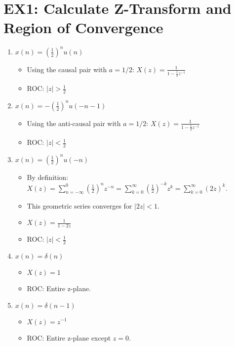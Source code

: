 \documentclass[a4paper,12pt]{article}
\begin{document}
\section*{EX1: Calculate Z-Transform and Region of Convergence}
\begin{enumerate}
    \item \textbf{$x(n) = (\frac{1}{2})^n u(n)$}
        \begin{itemize}
            \item Using the causal pair with $a=1/2$: $X(z) = \frac{1}{1-\frac{1}{2}z^{-1}}$
            \item ROC: $|z| > \frac{1}{2}$
        \end{itemize}

    \item \textbf{$x(n) = -(\frac{1}{2})^n u(-n-1)$}
        \begin{itemize}
            \item Using the anti-causal pair with $a=1/2$: $X(z) = \frac{1}{1-\frac{1}{2}z^{-1}}$
            \item ROC: $|z| < \frac{1}{2}$
        \end{itemize}
        
    \item \textbf{$x(n) = (\frac{1}{2})^n u(-n)$}
        \begin{itemize}
            \item By definition: $X(z) = \sum_{n=-\infty}^{0} (\frac{1}{2})^n z^{-n} = \sum_{k=0}^{\infty} (\frac{1}{2})^{-k} z^{k} = \sum_{k=0}^{\infty} (2z)^k$.
            \item This geometric series converges for $|2z|<1$.
            \item $X(z) = \frac{1}{1-2z}$
            \item ROC: $|z| < \frac{1}{2}$
        \end{itemize}

    \item \textbf{$x(n) = \delta(n)$}
        \begin{itemize}
            \item $X(z) = 1$
            \item ROC: Entire z-plane.
        \end{itemize}

    \item \textbf{$x(n) = \delta(n-1)$}
        \begin{itemize}
            \item $X(z) = z^{-1}$
            \item ROC: Entire z-plane except $z=0$.
        \end{itemize}


\end{enumerate}
\end{document}
